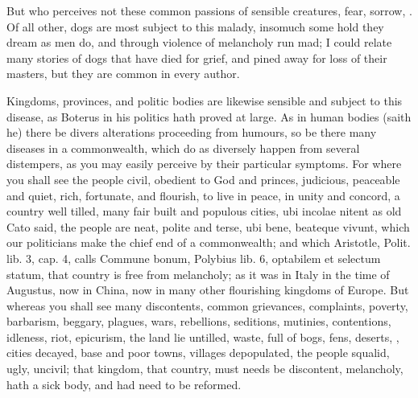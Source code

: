 {But who perceives not these common passions of sensible creatures,
fear, sorrow, \etc{}. Of all other, dogs are most subject to this malady,
insomuch some hold they dream as men do, and through violence of
melancholy run mad; I could relate many stories of dogs that have died
for grief, and pined away for loss of their masters, but they are
common in every author.

Kingdoms, provinces, and politic bodies are likewise sensible and
subject to this disease, as Boterus in his politics hath proved at
large. As in human bodies (saith he) there be divers alterations
proceeding from humours, so be there many diseases in a commonwealth,
which do as diversely happen from several distempers, as you may easily
perceive by their particular symptoms. For where you shall see the
people civil, obedient to God and princes, judicious, peaceable and
quiet, rich, fortunate, and flourish, to live in peace, in unity
and concord, a country well tilled, many fair built and populous
cities, ubi incolae nitent as old Cato said, the people are neat,
polite and terse, ubi bene, beateque vivunt, which our politicians make
the chief end of a commonwealth; and which  Aristotle, Polit. lib.
3, cap. 4, calls Commune bonum, Polybius lib. 6, optabilem et selectum
statum, that country is free from melancholy; as it was in Italy in the
time of Augustus, now in China, now in many other flourishing kingdoms
of Europe. But whereas you shall see many discontents, common
grievances, complaints, poverty, barbarism, beggary, plagues, wars,
rebellions, seditions, mutinies, contentions, idleness, riot,
epicurism, the land lie untilled, waste, full of bogs, fens, deserts,
\etc{}, cities decayed, base and poor towns, villages depopulated, the
people squalid, ugly, uncivil; that kingdom, that country, must needs
be discontent, melancholy, hath a sick body, and had need to be
reformed.

}
